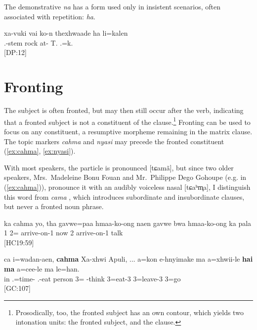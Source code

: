 The demonstrative \textit{na} has a form used only in insistent scenarios, often associated with repetition: \textit{ha}.

\ea
\gll xa-vuki vai ko-n thexhwaade ha li=kalen\\
 .-stem rock at- T.  .=k.\\
\glt {} {[DP:12]}
\z

\section{Fronting}
\label{sec:fronting}

The subject is often fronted, but may then still occur after the verb, indicating that a fronted subject is not a constituent of the clause.\footnote{Prosodically, too, the fronted subject has an own contour, which yields two intonation units: the fronted subject, and the clause.} Fronting can be used to focus on any constituent, a resumptive morpheme remaining in the matrix clause.
The topic markers \textit{cahma} and \textit{nyasi} may precede the fronted constituent (\ref{ex:cahma}, \ref{ex:nyasi}).

With most speakers, the particle is pronounced [tɕamã], but since two older speakers, Mrs.\ Madeleine Bonu Fouan and Mr.\ Philippe Dego Gohoupe (e.g. in (\ref{ex:cahma})), pronounce it with an audibly voiceless nasal [tɕaʰm̥a], I distinguish this word from \textit{cama} , which introduces subordinate and insubordinate clauses, but never a fronted noun phrase.


\ea\label{ex:cahma}
\gll ka cahma yo, tha gavwe=paa hmaa-ko-ong naen gavwe bwa hmaa-ko-ong ka pala\\
   1  2= arrive-on-1 now 2  arrive-on-1  talk\\
\glt {} {[HC19:59]}
\z

\ea
\gll ca i=wadan-aen, \textbf{cahma} Xa-xhwi Apuli, {\ob}...{\cb} a=kon e-hnyimake ma a=xhwii-le \textbf{hai} \textbf{ma} a=cee-le ma le=han.\\
 in .=time-  .-eat person {} 3= -think  3=eat-3   3=leave-3  3=go\\
\glt {} {[GC:107]}
\z


